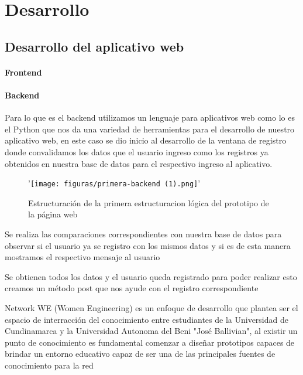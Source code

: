 \documentclass[hidelinks]{Documento}
\begin{document}
\chapter{Desarrollo}




\section{Desarrollo del aplicativo web}

\subsubsection{Frontend}

\subsubsection{Backend}
Para lo que es el backend utilizamos un lenguaje para aplicativos web como lo es el Python que nos da una variedad de herramientas para el desarrollo de nuestro aplicativo web, en este caso se dio inicio al desarrollo de la ventana de registro donde convalidamos los datos que el usuario ingreso como los registros ya obtenidos en nuestra base de datos para el respectivo ingreso al aplicativo.

 \begin{figure}[h]
\centering
'\texttt{[image: figuras/primera-backend (1).png]}'
\caption{Estructuración de la primera estructuracion lógica del prototipo de la página web }
\label{fig:Picture1.png}
\end{figure}

Se realiza las comparaciones correspondientes con nuestra base de datos para observar si el usuario ya se registro con los mismos datos y si es de esta manera mostramos el respectivo mensaje al usuario

Se obtienen todos los datos y el usuario queda registrado para poder realizar esto creamos un método post que nos ayude con el registro correspondiente


Network WE (Women Engineering) es un enfoque de desarrollo que plantea ser el espacio de interracción del conocimiento entre estudiantes de la Universidad de Cundinamarca y la Universidad Autonoma del Beni "José Ballivian", al existir un punto de conocimiento es fundamental comenzar a diseñar prototipos capaces de brindar un entorno educativo capaz de ser una de las principales fuentes de conocimiento para la red \cite{Latorre-Cosculluela2020}
\end{document}
